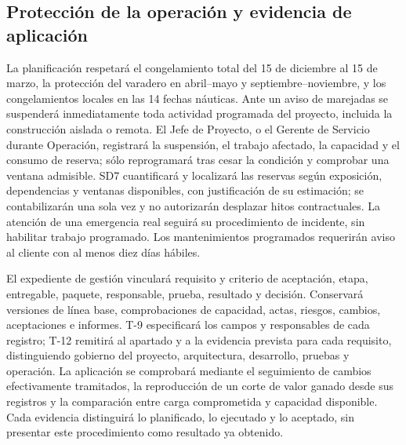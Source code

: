 \subsection{Protección de la operación y evidencia de aplicación}
La planificación respetará el congelamiento total del 15 de diciembre al 15 de marzo, la protección del varadero en abril--mayo y septiembre--noviembre, y los congelamientos locales en las 14 fechas náuticas. Ante un aviso de marejadas se suspenderá inmediatamente toda actividad programada del proyecto, incluida la construcción aislada o remota. El Jefe de Proyecto, o el Gerente de Servicio durante Operación, registrará la suspensión, el trabajo afectado, la capacidad y el consumo de reserva; sólo reprogramará tras cesar la condición y comprobar una ventana admisible. SD7 cuantificará y localizará las reservas según exposición, dependencias y ventanas disponibles, con justificación de su estimación; se contabilizarán una sola vez y no autorizarán desplazar hitos contractuales. La atención de una emergencia real seguirá su procedimiento de incidente, sin habilitar trabajo programado. Los mantenimientos programados requerirán aviso al cliente con al menos diez días hábiles. \parencites[cap.~10, restricción 12, p.~26; numeral 13.2, p.~29; cap.~15, RT-10.05, p.~34]{sd6-c07}[art.~20, p.~15]{sd6-ba}[RT-10.05, p.~22]{sd6-bt}

El expediente de gestión vinculará requisito y criterio de aceptación, etapa, entregable, paquete, responsable, prueba, resultado y decisión. Conservará versiones de línea base, comprobaciones de capacidad, actas, riesgos, cambios, aceptaciones e informes. T-9 especificará los campos y responsables de cada registro; T-12 remitirá al apartado y a la evidencia prevista para cada requisito, distinguiendo gobierno del proyecto, arquitectura, desarrollo, pruebas y operación. La aplicación se comprobará mediante el seguimiento de cambios efectivamente tramitados, la reproducción de un corte de valor ganado desde sus registros y la comparación entre carga comprometida y capacidad disponible. Cada evidencia distinguirá lo planificado, lo ejecutado y lo aceptado, sin presentar este procedimiento como resultado ya obtenido.